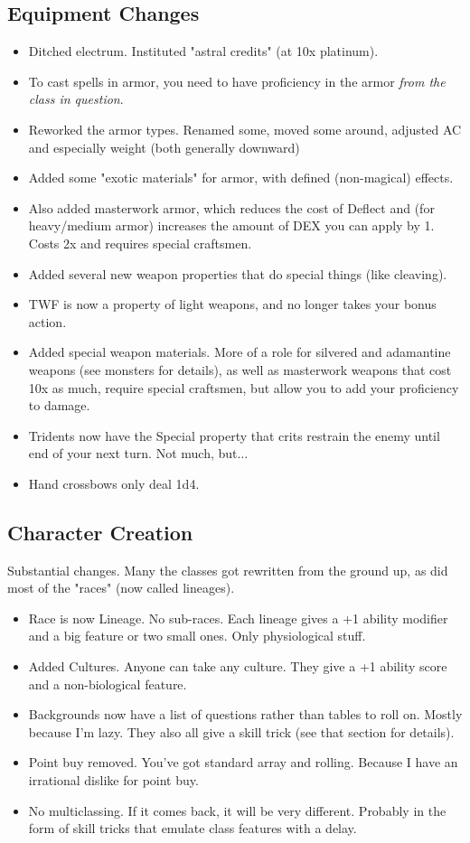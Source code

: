\subsection*{Equipment Changes}
\begin{itemize}
    \item Ditched electrum. Instituted "astral credits" (at 10x platinum).
    \item To cast spells in armor, you need to have proficiency in the armor \textit{from the class in question}.
    \item Reworked the armor types. Renamed some, moved some around, adjusted AC and especially weight (both generally downward)
    \item Added some "exotic materials" for armor, with defined (non-magical) effects.
    \item Also added masterwork armor, which reduces the cost of Deflect and (for heavy/medium armor) increases the amount of DEX you can apply by 1. Costs 2x and requires special craftsmen.
    \item Added several new weapon properties that do special things (like cleaving).
    \item TWF is now a property of light weapons, and no longer takes your bonus action.
    \item Added special weapon materials. More of a role for silvered and adamantine weapons (see monsters for details), as well as masterwork weapons that cost 10x as much, require special craftsmen, but allow you to add your proficiency to damage.
    \item Tridents now have the Special property that crits restrain the enemy until end of your next turn. Not much, but$\dots$
    \item Hand crossbows only deal 1d4.
\end{itemize}
\subsection*{Character Creation}
Substantial changes. Many the classes got rewritten from the ground up, as did most of the "races" (now called lineages). 
\begin{itemize}
    \item Race is now Lineage. No sub-races. Each lineage gives a +1 ability modifier and a big feature or two small ones. Only physiological stuff.
    \item Added Cultures. Anyone can take any culture. They give a +1 ability score and a non-biological feature.
    \item Backgrounds now have a list of questions rather than tables to roll on. Mostly because I'm lazy. They also all give a skill trick (see that section for details).
    \item Point buy removed. You've got standard array and rolling. Because I have an irrational dislike for point buy.
    \item No multiclassing. If it comes back, it will be very different. Probably in the form of skill tricks that emulate class features with a delay.
\end{itemize}

